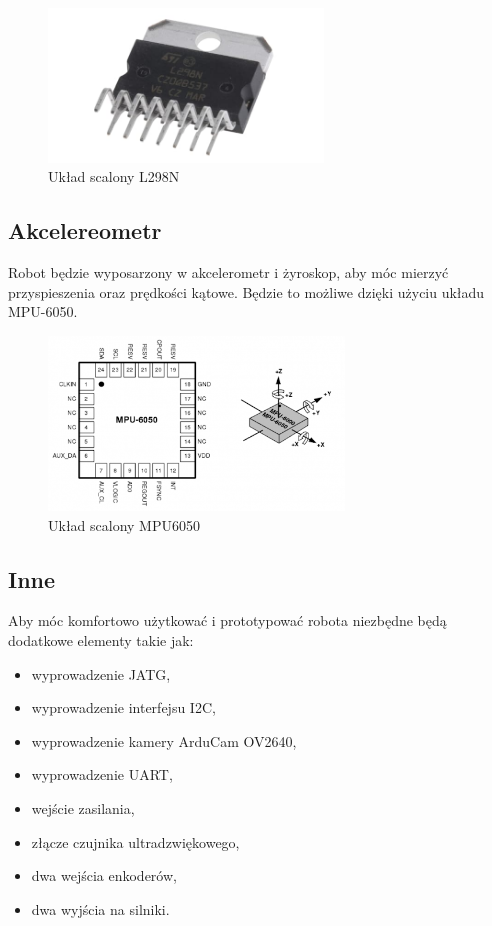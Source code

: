 \documentclass[10pt, a4paper]{article}
\begin{document}
\begin{figure}[H]
	\centering
	\includegraphics[width=0.65\textwidth]{figures/l298.jpg}
	\caption{Układ scalony L298N}
	\label{fig:l298n}
\end{figure}

\subsection{Akcelereometr}
Robot będzie wyposarzony w akcelerometr i żyroskop, aby móc mierzyć przyspieszenia oraz prędkości kątowe.
Będzie to możliwe dzięki użyciu układu MPU-6050.

\begin{figure}[H]
	\centering
	\includegraphics[width=0.7\textwidth]{figures/mpu6050.png}
	\caption{Układ scalony MPU6050}
	\label{fig:mpu6050}
\end{figure}

\subsection{Inne}
Aby móc komfortowo użytkować i prototypować robota niezbędne będą dodatkowe elementy takie jak:
\begin{itemize}
	\item wyprowadzenie JATG,
	\item wyprowadzenie interfejsu I2C,
	\item wyprowadzenie kamery ArduCam OV2640,
	\item wyprowadzenie UART,
	\item wejście zasilania,
	\item złącze czujnika ultradzwiękowego,
	\item dwa wejścia enkoderów,
	\item dwa wyjścia na silniki.
\end{itemize}
\end{document}
